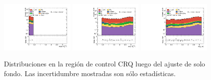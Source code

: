\begin{figure}[ht!]
\begin{center}
    \includegraphics[width=0.32\textwidth]{images_tmp/results/fr2/can_CRQ_dphi_jetmet_afterFit.pdf}
    \includegraphics[width=0.32\textwidth]{images_tmp/results/fr2/can_CRQ_dphi_gammet_afterFit.pdf}
    \includegraphics[width=0.32\textwidth]{images_tmp/results/fr2/can_CRQ_dphi_gamjet_afterFit.pdf}

    \caption{Distribuciones en la región de control CRQ luego del ajuste de solo fondo. Las incertidumbre mostradas son sólo estadísticas.}
  \label{fig:crq_dist}
  \end{center}
\end{figure}

